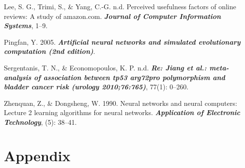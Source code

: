 \documentclass[12pt,a4paper,]{article}
\begin{document}
\leavevmode\hypertarget{ref-LeePerceived}{}%
Lee, S. G., Trimi, S., \& Yang, C.-G. n.d. Perceived usefulness factors
of online reviews: A study of amazon.com. \emph{\textbf{Journal of
Computer Information Systems}}, 1--9.

\leavevmode\hypertarget{ref-YanPingFan}{}%
Pingfan, Y. 2005. \emph{\textbf{Artificial neural networks and simulated
evolutionary computation (2nd edition)}}.

\leavevmode\hypertarget{ref-SergentanisRe}{}%
Sergentanis, T. N., \& Economopoulos, K. P. n.d. \emph{\textbf{Re: Jiang
et al.: meta-analysis of association between tp53 arg72pro polymorphism
and bladder cancer risk (urology 2010;76:765)}}, 77(1): 0--260.

\leavevmode\hypertarget{ref-ZhuangZhenQuan}{}%
Zhenquan, Z., \& Dongsheng, W. 1990. Neural networks and neural
computers: Lecture 2 learning algorithms for neural networks.
\emph{\textbf{Application of Electronic Technology}}, (5): 38--41.

\newpage

\hypertarget{appendix}{%
\section*{Appendix}\label{appendix}}
\end{document}
